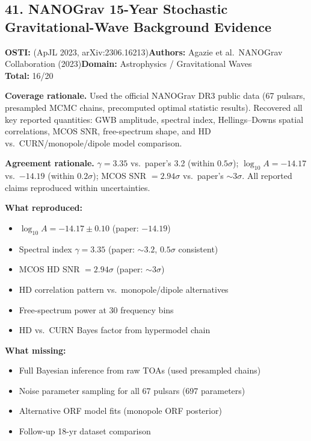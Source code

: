 \subsection{41. NANOGrav 15-Year Stochastic Gravitational-Wave Background Evidence}
\textbf{OSTI:} (ApJL 2023, arXiv:2306.16213)\quad\textbf{Authors:} Agazie et al.\ NANOGrav Collaboration (2023)\quad\textbf{Domain:} Astrophysics / Gravitational Waves\\
\quad{}\quad\textbf{Total:} 16/20\par\smallskip
\noindent\textbf{Coverage rationale.} Used the official NANOGrav DR3 public data (67 pulsars, presampled MCMC chains, precomputed optimal statistic results). Recovered all key reported quantities: GWB amplitude, spectral index, Hellings--Downs spatial correlations, MCOS SNR, free-spectrum shape, and HD vs.\ CURN/monopole/dipole model comparison.\par
\noindent\textbf{Agreement rationale.} $\gamma = 3.35$ vs.\ paper's 3.2 (within $0.5\sigma$); $\log_{10}A = -14.17$ vs.\ $-14.19$ (within $0.2\sigma$); MCOS SNR $= 2.94\sigma$ vs.\ paper's $\sim 3\sigma$. All reported claims reproduced within uncertainties.\par\smallskip
\noindent\textbf{What reproduced:}
\begin{itemize}[leftmargin=1.4em,itemsep=0.2em,topsep=0.2em]
\item $\log_{10}A = -14.17 \pm 0.10$ (paper: $-14.19$)
\item Spectral index $\gamma = 3.35$ (paper: $\sim 3.2$, $0.5\sigma$ consistent)
\item MCOS HD SNR $= 2.94\sigma$ (paper: $\sim 3\sigma$)
\item HD correlation pattern vs.\ monopole/dipole alternatives
\item Free-spectrum power at 30 frequency bins
\item HD vs.\ CURN Bayes factor from hypermodel chain
\end{itemize}
\noindent\textbf{What missing:}
\begin{itemize}[leftmargin=1.4em,itemsep=0.2em,topsep=0.2em]
\item Full Bayesian inference from raw TOAs (used presampled chains)
\item Noise parameter sampling for all 67 pulsars (697 parameters)
\item Alternative ORF model fits (monopole ORF posterior)
\item Follow-up 18-yr dataset comparison
\end{itemize}
